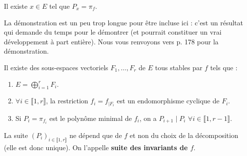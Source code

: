 
  \begin{lemma}
    \label{invariants-de-similitude-2}
    Il existe $x \in E$ tel que $P_x = \pi_f$.
  \end{lemma}

  La démonstration est un peu trop longue pour être incluse ici : c'est un résultat qui demande du temps pour le démontrer (et pourrait constituer un vrai développement à part entière). Nous vous renvoyons vers \cite{[GOU21]} p. 178 pour la démonstration.

  \begin{theorem}
    Il existe des sous-espaces vectoriels $F_1, \dots, F_r$ de $E$ tous stables par $f$ tels que :
    \begin{enumerate}[label={\bfseries(\roman*)}]
      \item \label{invariants-de-similitude-3} $E = \bigoplus_{i = 1}^r F_i$.
      \item \label{invariants-de-similitude-4} $\forall i \in \llbracket 1, r \rrbracket$, la restriction $f_i = f_{|F_i}$ est un endomorphisme cyclique de $F_i$.
      \item \label{invariants-de-similitude-5} Si $P_i = \pi_{f_i}$ est le polynôme minimal de $f_i$, on a $P_{i+1} \mid P_i$ $\forall i \in \llbracket 1, r-1 \rrbracket$.
    \end{enumerate}
    La suite $(P_i)_{i \in \llbracket 1, r \rrbracket}$ ne dépend que de $f$ et non du choix de la décomposition (elle est donc unique). On l'appelle \textbf{suite des invariants de $f$}.
  \end{theorem}


